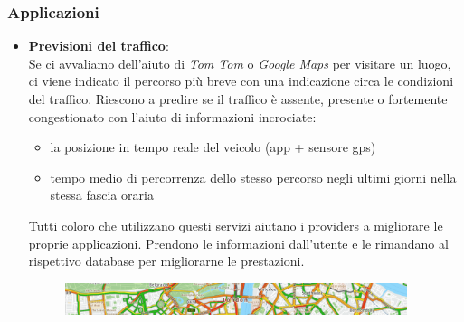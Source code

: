 \begin{frame}
	
	\frametitle{Applicazioni}
		\begin{itemize}
			\item \textbf{Previsioni del traffico}:\\
				Se ci avvaliamo dell'aiuto di \textit{Tom Tom} o \textit{Google Maps} per visitare un luogo, ci viene indicato il percorso più breve con una indicazione circa le condizioni del traffico. 
				Riescono a predire se il traffico è assente, presente o fortemente congestionato con l'aiuto di informazioni incrociate: 
				\begin{itemize}
				 		\item la posizione in tempo reale del veicolo (app + sensore gps)
				 		\item tempo medio di percorrenza dello stesso percorso negli ultimi giorni nella stessa fascia oraria
				 	\end{itemize}
				Tutti coloro che utilizzano questi servizi aiutano i providers a migliorare le proprie applicazioni.
				Prendono le informazioni dall'utente e le rimandano al rispettivo database per migliorarne le prestazioni.
				 	
			\begin{figure}[!htbp]
				\centering
				\includegraphics[width=10cm]{images/intro/tom_tom_traffic.png}
			\end{figure}
			
		\end{itemize}		

\end{frame}



